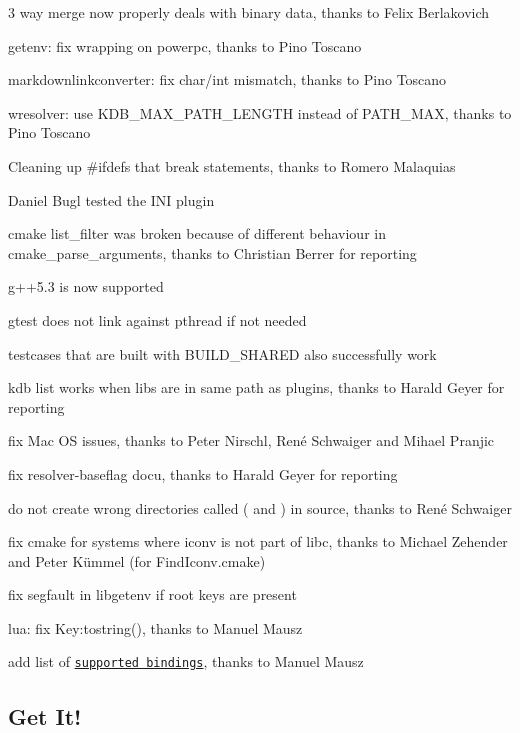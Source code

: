 \begin{DoxyItemize}
\item 3 way merge now properly deals with binary data, thanks to Felix Berlakovich
\item getenv\+: fix wrapping on powerpc, thanks to Pino Toscano
\item markdownlinkconverter\+: fix char/int mismatch, thanks to Pino Toscano
\item wresolver\+: use K\+D\+B\+\_\+\+M\+A\+X\+\_\+\+P\+A\+T\+H\+\_\+\+L\+E\+N\+G\+T\+H instead of P\+A\+T\+H\+\_\+\+M\+A\+X, thanks to Pino Toscano
\item Cleaning up \#ifdefs that break statements, thanks to Romero Malaquias
\item Daniel Bugl tested the I\+N\+I plugin
\item cmake list\+\_\+filter was broken because of different behaviour in cmake\+\_\+parse\+\_\+arguments, thanks to Christian Berrer for reporting
\item g++5.3 is now supported
\item gtest does not link against pthread if not needed
\item testcases that are built with B\+U\+I\+L\+D\+\_\+\+S\+H\+A\+R\+E\+D also successfully work
\item kdb list works when libs are in same path as plugins, thanks to Harald Geyer for reporting
\item fix Mac O\+S issues, thanks to Peter Nirschl, René Schwaiger and Mihael Pranjic
\item fix resolver-\/baseflag docu, thanks to Harald Geyer for reporting
\item do not create wrong directories called {\ttfamily (} and {\ttfamily )} in source, thanks to René Schwaiger
\item fix cmake for systems where iconv is not part of libc, thanks to Michael Zehender and Peter Kümmel (for Find\+Iconv.\+cmake)
\item fix segfault in libgetenv if root keys are present
\item lua\+: fix Key\+:tostring(), thanks to Manuel Mausz
\item add list of \href{https://github.com/ElektraInitiative/libelektra/tree/master/src/bindings}{\tt supported bindings}, thanks to Manuel Mausz
\end{DoxyItemize}

\subsection*{Get It!}


